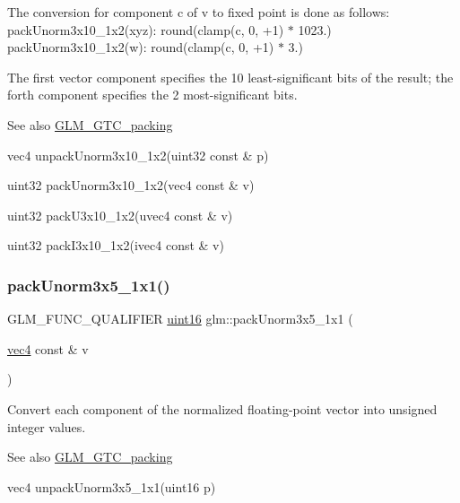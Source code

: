 The conversion for component c of v to fixed point is done as follows\+: pack\+Unorm3x10\+\_\+1x2(xyz)\+: round(clamp(c, 0, +1) $\ast$ 1023.) pack\+Unorm3x10\+\_\+1x2(w)\+: round(clamp(c, 0, +1) $\ast$ 3.)

The first vector component specifies the 10 least-\/significant bits of the result; the forth component specifies the 2 most-\/significant bits.

\begin{DoxySeeAlso}{See also}
\hyperlink{group__gtc__packing}{G\+L\+M\+\_\+\+G\+T\+C\+\_\+packing} 

vec4 unpack\+Unorm3x10\+\_\+1x2(uint32 const \& p) 

uint32 pack\+Unorm3x10\+\_\+1x2(vec4 const \& v) 

uint32 pack\+U3x10\+\_\+1x2(uvec4 const \& v) 

uint32 pack\+I3x10\+\_\+1x2(ivec4 const \& v) 
\end{DoxySeeAlso}
\mbox{\label{group__gtc__packing_ga1b41375846ed66768da78ca299d8d010}} 
\subsubsection{\texorpdfstring{pack\+Unorm3x5\+\_\+1x1()}{packUnorm3x5\_1x1()}}
{\footnotesize\ttfamily G\+L\+M\+\_\+\+F\+U\+N\+C\+\_\+\+Q\+U\+A\+L\+I\+F\+I\+ER \hyperlink{group__gtc__type__precision_gad8c2939e1fdd8e5828b31d95c52255d5}{uint16} glm\+::pack\+Unorm3x5\+\_\+1x1 (\begin{DoxyParamCaption}\item[{\hyperlink{group__core__types_ga5881b1b022d7fd1b7218f5916532dd02}{vec4} const \&}]{v }\end{DoxyParamCaption})}

Convert each component of the normalized floating-\/point vector into unsigned integer values.

\begin{DoxySeeAlso}{See also}
\hyperlink{group__gtc__packing}{G\+L\+M\+\_\+\+G\+T\+C\+\_\+packing} 

vec4 unpack\+Unorm3x5\+\_\+1x1(uint16 p) 
\end{DoxySeeAlso}
\mbox{\label{group__gtc__packing_gac561f06c908b7302537a8ef29fcb409e}} 
